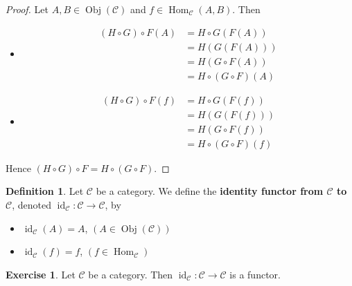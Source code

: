 \documentclass[12pt]{amsart}
\theoremstyle{definition}
\newtheorem{defn}[definition]{Definition}
\newtheorem{ex}[definition]{Exercise}
\newcommand{\MC}{\mathcal{C}}
\DeclareMathOperator{\id}{id}
\DeclareMathOperator{\Obj}{Obj}
\DeclareMathOperator{\Hom}{Hom}
\DeclareMathOperator*{\0}{\mbf{0}}
\DeclareMathOperator*{\1}{\mbf{1}}
\newcommand{\lex}[1]{\label{ex:#1}}
\newcommand{\ld}[1]{\label{defn:#1}}
\begin{document}
	\begin{proof}
		Let $A, B \in \Obj(\MC)$ and $f \in \Hom_{\MC}(A,B)$. Then 
		\begin{itemize}
				\item 
				\begin{align*}
					(H \circ G) \circ F(A) 
					& = H \circ G (F(A)) \\
					& = H (G(F(A))) \\
					& = H( G \circ F (A)) \\
					& = H \circ (G \circ F) (A)
				\end{align*}
				\item  
				\begin{align*}
					(H \circ G) \circ F(f) 
					& = H \circ G (F(f)) \\
					& = H (G(F(f))) \\
					& = H( G \circ F (f)) \\
					& = H \circ (G \circ F) (f)
				\end{align*}
		\end{itemize}
		Hence $(H \circ G) \circ F = H \circ (G \circ F)$.
	\end{proof}

	\begin{defn} \ld{13004}
		Let $\MC$ be a category. We define the \textbf{identity functor from $\MC$ to $\MC$}, denoted $\id_{\MC}: \MC \rightarrow \MC$, by 
		\begin{itemize}
			\item $\id_{\MC}(A) = A$, $(A \in \Obj(\MC))$
			\item $\id_{\MC}(f) = f$, $(f \in \Hom_{\MC})$
		\end{itemize}
	\end{defn}
	
	\begin{ex}  \lex{13005}
		Let $\MC$ be a category. Then $\id_{\MC}: \MC \rightarrow \MC$ is a functor.
	\end{ex}
	
\end{document}

